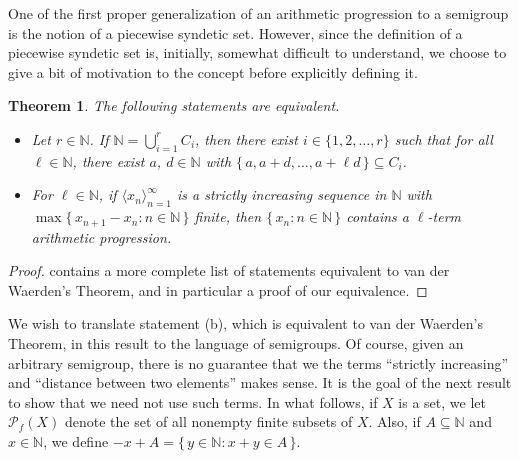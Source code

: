 \documentclass[12pt]{article}
\theoremstyle{plain}
\newtheorem{thm}{Theorem}[section]
\theoremstyle{definition}
\newcommand{\la}{\langle}
\newcommand{\ra}{\rangle}
\newcommand{\bbN}{\mathbb{N}}
\newcommand{\Pf}{\mathcal{P}_f}
\begin{document}
One of the first proper generalization of an arithmetic progression to
a semigroup is the notion of a piecewise syndetic set. 
However, since the definition of a piecewise syndetic set is, initially,
somewhat difficult to understand, we choose to give a bit of
motivation to the concept before explicitly defining it. 


\begin{thm}
  The following statements are equivalent.
  \begin{itemize}
    \item[(a)] Let $r \in \bbN$.
      If $\bbN = \bigcup_{i=1}^r C_i$, then there exist $i \in \{1, 2,
      \ldots, r\}$ such that for all $\ell \in \bbN$, there exist $a$,
      $d \in \bbN$ with $\{\, a, a+d, \ldots, a+\ell d \,\} \subseteq
      C_i$. 

    \item[(b)] For $\ell \in \bbN$, if $\la x_n \ra_{n=1}^\infty$ is a
      strictly increasing sequence in $\bbN$ with $\max\{\, x_{n+1} -
      x_n : n \in \bbN \,\}$ finite, then $\{\, x_n : n \in \bbN
      \,\}$ contains a \mbox{$\ell$-term} arithmetic progression. 
  \end{itemize}
\end{thm}
\begin{proof}
  \cite[Theorem 2.5]{Landman:2004fk} contains a more complete list of
  statements equivalent to van der Waerden's Theorem, and in particular
  a proof of our equivalence. 
\end{proof}

We wish to translate statement (b), which is equivalent to van der
Waerden's Theorem, in this result to the language of semigroups.
Of course, given an arbitrary semigroup, there is no guarantee that we
the terms ``strictly increasing'' and ``distance between two
elements'' makes sense.
It is the goal of the next result to show that we need not use such
terms.
In what follows, if $X$ is a set, we let $\Pf(X)$ denote the set of
all nonempty finite subsets of $X$. 
Also, if $A \subseteq \bbN$ and $x \in \bbN$, we define $-x + A = \{\,
y \in \bbN : x + y \in A \,\}$.
\end{document}
